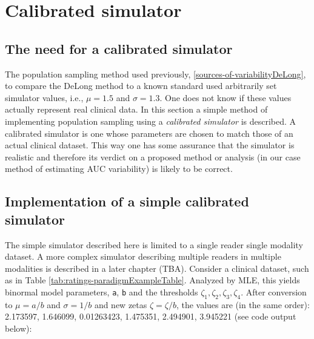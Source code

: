 \documentclass[
]{book}
\begin{document}
\hypertarget{sources-of-variabilityCalSimulator}{%
\section{Calibrated simulator}\label{sources-of-variabilityCalSimulator}}

\hypertarget{the-need-for-a-calibrated-simulator}{%
\subsection{The need for a calibrated simulator}\label{the-need-for-a-calibrated-simulator}}

The population sampling method used previously, \ref{sources-of-variabilityDeLong}, to compare the DeLong method to a known standard used arbitrarily set simulator values, i.e., \(\mu = 1.5\) and \(\sigma = 1.3\). One does not know if these values actually represent real clinical data. In this section a simple method of implementing population sampling using a \emph{calibrated simulator} is described. A calibrated simulator is one whose parameters are chosen to match those of an actual clinical dataset. This way one has some assurance that the simulator is realistic and therefore its verdict on a proposed method or analysis (in our case method of estimating AUC variability) is likely to be correct.

\hypertarget{implementation-of-a-simple-calibrated-simulator}{%
\subsection{Implementation of a simple calibrated simulator}\label{implementation-of-a-simple-calibrated-simulator}}

The simple simulator described here is limited to a single reader single modality dataset. A more complex simulator describing multiple readers in multiple modalities is described in a later chapter (TBA). Consider a clinical dataset, such as in Table \ref{tab:ratings-paradigmExampleTable}. Analyzed by MLE, this yields binormal model parameters, \texttt{a}, \texttt{b} and the thresholds \(\zeta_1,\zeta_2,\zeta_3,\zeta_4\). After conversion to \(\mu=a/b\) and \(\sigma= 1/b\) and new zetas \(\zeta = \zeta/b\), the values are (in the same order): 2.173597, 1.646099, 0.01263423, 1.475351, 2.494901, 3.945221 (see code output below):
\end{document}

